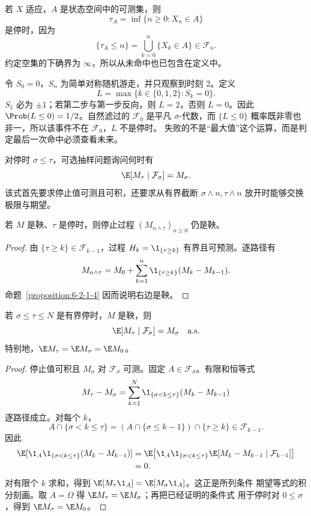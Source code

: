 \begin{example}[首次命中]\label{ex:6-2-3-1}
若 $X$ 适应，$A$ 是状态空间中的可测集，则
\[
  \tau_A=\inf\{n\ge0:X_n\in A\}
\]
是停时，因为
\[
  \{\tau_A\le n\}=\bigcup_{k=0}^n\{X_k\in A\}\in\mathcal F_n.
\]
约定空集的下确界为 $\infty$，所以从未命中也已包含在定义中。
\end{example}

\begin{example}[最后命中不是停时]\label{ex:6-2-3-2}
令 $S_0=0$，$S_n$ 为简单对称随机游走，并只观察到时刻 $2$。定义
\[
  L=\max\{k\in\{0,1,2\}:S_k=0\}.
\]
$S_1$ 必为 $\pm1$；若第二步与第一步反向，则 $L=2$，否则 $L=0$。因此
$\Prob(L\le0)=1/2$。自然滤过的 $\mathcal F_0$ 是平凡 $\sigma$-代数，而
$\{L\le0\}$ 概率既非零也非一，所以该事件不在 $\mathcal F_0$，$L$ 不是停时。
失败的不是“最大值”这个运算，而是判定最后一次命中必须查看未来。
\end{example}

\begin{definition}[可选抽样问题]\label{def:6-2-3-3}
对停时 $\sigma\le\tau$，可选抽样问题询问何时有
\[
  \E[M_\tau\mid\mathcal F_\sigma]=M_\sigma.
\]
该式首先要求停止值可测且可积，还要求从有界截断
$\sigma\wedge n,\tau\wedge n$ 放开时能够交换极限与期望。
\end{definition}

\begin{proposition}[停止保持鞅性]\label{proposition:6-2-3-1}
若 $M$ 是鞅、$\tau$ 是停时，则停止过程 $(M_{n\wedge\tau})_{n\ge0}$ 仍是鞅。
\end{proposition}

\begin{proof}
由 $\{\tau\ge k\}\in\mathcal F_{k-1}$，过程
$H_k=\1_{\{\tau\ge k\}}$ 有界且可预测。逐路径有
\[
 M_{n\wedge\tau}
 =M_0+\sum_{k=1}^n\1_{\{\tau\ge k\}}(M_k-M_{k-1}).
\]
命题~\ref{proposition:6-2-1-4} 因而说明右边是鞅。
\end{proof}

\begin{theorem}[有界可选抽样]\label{theorem:6-2-3-2}
若 $\sigma\le\tau\le N$ 是有界停时，$M$ 是鞅，则
\[
  \E[M_\tau\mid\mathcal F_\sigma]=M_\sigma\quad\text{a.s.}
\]
特别地，$\E M_\tau=\E M_\sigma=\E M_0$。
\end{theorem}

\begin{proof}
停止值可积且 $M_\sigma$ 对 $\mathcal F_\sigma$ 可测。固定
$A\in\mathcal F_\sigma$。有限和恒等式
\[
 M_\tau-M_\sigma
 =\sum_{k=1}^N\1_{\{\sigma<k\le\tau\}}(M_k-M_{k-1})
\]
逐路径成立。对每个 $k$，
\[
 A\cap\{\sigma<k\le\tau\}
 =(A\cap\{\sigma\le k-1\})\cap\{\tau\ge k\}
 \in\mathcal F_{k-1}.
\]
因此
\begin{align*}
 \E[\1_A\1_{\{\sigma<k\le\tau\}}(M_k-M_{k-1})]
 &=\E\!\left[\1_A\1_{\{\sigma<k\le\tau\}}
     \E[M_k-M_{k-1}\mid\mathcal F_{k-1}]\right]\\
 &=0.
\end{align*}
对有限个 $k$ 求和，得到 $\E[M_\tau\1_A]=\E[M_\sigma\1_A]$。这正是所列条件
期望等式的积分刻画。取 $A=\Omega$ 得 $\E M_\tau=\E M_\sigma$；再把已经证明的条件式
用于停时对 $0\le\sigma$，得到 $\E M_\sigma=\E M_0$。
\end{proof}

